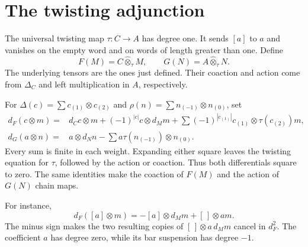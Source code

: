 \section{The twisting adjunction}
The universal twisting map $\tau:C\to A$ has degree one.
It sends $[a]$ to $a$ and vanishes on the empty word and on words of length greater than one.
Define
\[
 F(M)=C\widehat\otimes_\tau M,\qquad
 G(N)=A\widehat\otimes_\tau N.
\]
The underlying tensors are the ones just defined.
Their coaction and action come from $\Delta_C$ and left multiplication in $A$, respectively.

For $\Delta(c)=\sum c_{(1)}\otimes c_{(2)}$ and $\rho(n)=\sum n_{(-1)}\otimes n_{(0)}$, set
\begin{equation}\label{eq:cbc:modules:twists}
\begin{aligned}
 d_F(c\otimes m)={}&d_Cc\otimes m+(-1)^{|c|}c\otimes d_Mm
   +\sum(-1)^{|c_{(1)}|}c_{(1)}\otimes\tau(c_{(2)})m,\\
 d_G(a\otimes n)={}&a\otimes d_Nn
   -\sum a\tau(n_{(-1)})\otimes n_{(0)}.
\end{aligned}
\end{equation}
Every sum is finite in each weight.
Expanding either square leaves the twisting equation for $\tau$, followed by the action or coaction.
Thus both differentials square to zero.
The same identities make the coaction of $F(M)$ and the action of $G(N)$ chain maps.

For instance,
\[
 d_F([a]\otimes m)=-[a]\otimes d_Mm+[\,]\otimes am.
\]
The minus sign makes the two resulting copies of $[\,]\otimes a\,d_Mm$ cancel in $d_F^2$.
The coefficient $a$ has degree zero, while its bar suspension has degree $-1$.

